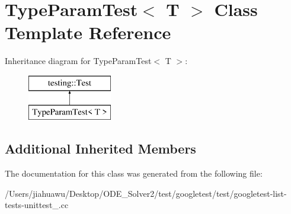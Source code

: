 \hypertarget{class_type_param_test}{}\section{Type\+Param\+Test$<$ T $>$ Class Template Reference}
\label{class_type_param_test}
Inheritance diagram for Type\+Param\+Test$<$ T $>$\+:\begin{figure}[H]
\begin{center}
\leavevmode
\includegraphics[height=2.000000cm]{class_type_param_test}
\end{center}
\end{figure}
\subsection*{Additional Inherited Members}


The documentation for this class was generated from the following file\+:\begin{DoxyCompactItemize}
\item 
/\+Users/jiahuawu/\+Desktop/\+O\+D\+E\+\_\+\+Solver2/test/googletest/test/googletest-\/list-\/tests-\/unittest\+\_\+.\+cc\end{DoxyCompactItemize}
